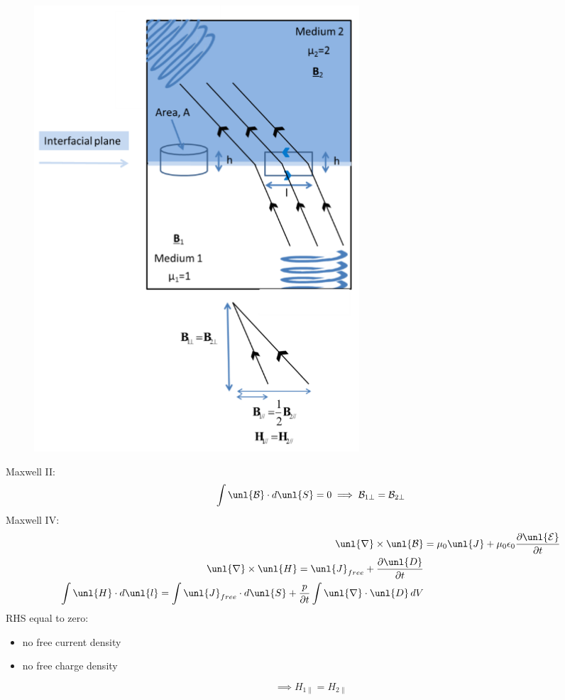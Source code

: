 \documentclass[a4paper, 11pt, normalem]{report}
\newcommand\p{\partial}
\newcommand\E{\mathcal{E}}
\newcommand\uE{\unl{\E}}
\newcommand\B{\mathcal{B}}
\newcommand\uB{\unl{\B}}
\newcommand\del{\unl{\nabla}}
\newcommand\eno{\epsilon_0}
\newcommand\J{\unl{J}}
\begin{document}
\begin{figure}[H]
  	\centering
  	\includegraphics[scale=0.4]{wolfgang2.png}
\end{figure}

Maxwell \RN{2}:
\begin{equation}
	\int \uB\cdot d\unl{S} = 0 \implies \B_{1\perp} = \B_{2\perp}
\end{equation}
Maxwell \RN{4}:
\begin{align}
	\del\times\uB &= \mu_0\J + \mu_0\eno\frac{\p\uE}{\p t} \\
	\del\times\unl{H} = \J_{free} + \frac{\p\unl{D}}{\p t} \\
	\int \unl{H}\cdot d\unl{l} = \int \J_{free}\cdot d\unl{S} + \frac{p}{\p t}\int \del\cdot\unl{D}\,dV
\end{align}
RHS equal to zero:
\begin{itemize}
	\item no free current density
	\item no free charge density
\end{itemize}
\begin{equation}
	\implies H_{1\parallel} = H_{2\parallel}
\end{equation}
\end{document}
